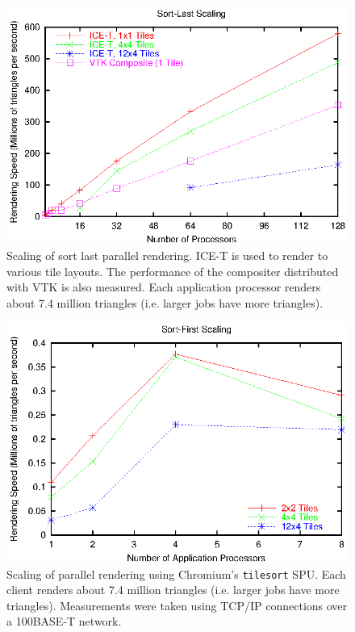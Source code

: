 \documentclass{acmsiggraph}
\newcommand{\cidentifier}[1]{\texttt{#1}}
\begin{document}
  \begin{figure}
    \includegraphics[width=\linewidth]{images/scaling_icet_weak}
    \caption{Scaling of sort last parallel rendering.  ICE-T is used to
      render to various tile layouts.  The performance of the compositer
      distributed with VTK is also measured.  Each application processor
      renders about 7.4 million triangles (i.e. larger jobs have more
      triangles).}
    \label{fig:ice-t}
  \end{figure}

  \begin{figure}
    \includegraphics[width=\linewidth]{images/scaling_chromium}
    \caption{Scaling of parallel rendering using Chromium's
      \cidentifier{tile\-sort} SPU.  Each client renders about 7.4 million
      triangles (i.e. larger jobs have more triangles).  Measurements were
      taken using TCP/IP connections over a 100BASE-T network.}
    \label{fig:chromium}
  \end{figure}
\end{document}
